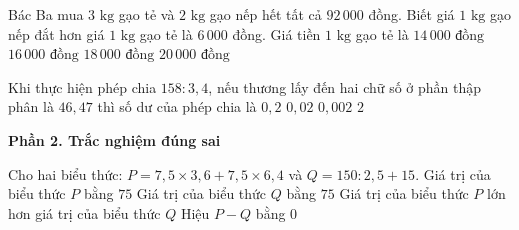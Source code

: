 \begin{ex} %
Bác Ba mua $3\text{ kg}$ gạo tẻ và $2\text{ kg}$ gạo nếp hết tất cả $92\,000$ đồng. Biết giá $1\text{ kg}$ gạo nếp đắt hơn giá $1\text{ kg}$ gạo tẻ là $6\,000$ đồng. Giá tiền $1\text{ kg}$ gạo tẻ là
\choice
{$14\,000\text{ đồng}$}
{\True $16\,000\text{ đồng}$}
{$18\,000\text{ đồng}$}
{$20\,000\text{ đồng}$}
\end{ex}

\begin{ex} %
Khi thực hiện phép chia $158 : 3{,}4$, nếu thương lấy đến hai chữ số ở phần thập phân là $46{,}47$ thì số dư của phép chia là
\choice
{$0{,}2$}
{$0{,}02$}
{\True $0{,}002$}
{$2$}
\end{ex}

\textbf{Phần 2. Trắc nghiệm đúng sai}

\begin{ex} %
Cho hai biểu thức: $P = 7{,}5 \times 3{,}6 + 7{,}5 \times 6{,}4$ và $Q = 150 : 2{,}5 + 15$.
\choiceTF
{\True Giá trị của biểu thức $P$ bằng $75$}
{\True Giá trị của biểu thức $Q$ bằng $75$}
{Giá trị của biểu thức $P$ lớn hơn giá trị của biểu thức $Q$}
{\True Hiệu $P - Q$ bằng $0$}
\end{ex}

